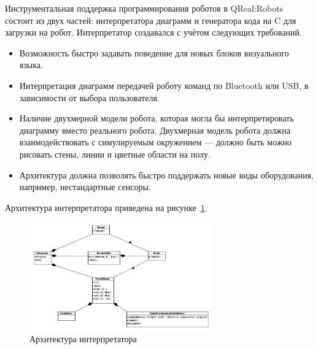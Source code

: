 \documentclass[a4paper]{article}
\begin{document}
Инструментальная поддержка программирования роботов в QReal:Robots состоит из двух частей: интерпретатора диаграмм и генератора кода на C для загрузки на робот. Интерпретатор создавался с учётом следующих требований.
\begin{itemize}
  \item Возможность быстро задавать поведение для новых блоков визуального языка.
  \item Интерпретация диаграмм передачей роботу команд по Bluetooth или USB, в зависимости от выбора пользователя.
  \item Наличие двухмерной модели робота, которая могла бы интерпретировать диаграмму вместо реального робота. Двухмерная модель робота должна взаимодействовать с симулируемым окружением --- должно быть можно рисовать стены, линии и цветные области на полу.
  \item Архитектура должна позволять быстро поддержать новые виды оборудования, например, нестандартные сенсоры.
\end{itemize}

Архитектура интерпретатора приведена на рисунке~\ref{interpreterArchitecture}.

\begin{figure} [ht]
  \begin{center}
    \includegraphics[width=0.7\textwidth]{interpreterArchitecture.jpg}
    \caption{Архитектура интерпретатора}
    \label{interpreterArchitecture}
  \end{center}
\end{figure}
\end{document}
